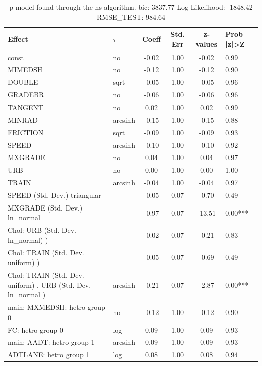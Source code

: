 \begin{table}
	\caption{p model found through the hs algorithm. bic: 3837.77 Log-Likelihood: -1848.42 RMSE_TEST: 984.64}
	\begin{center}
		\begin{tabular}{|l|l|c|c|c|l|}
			\hline
			Effect & $\tau$ & Coeff & Std. Err & z-values & Prob |z|>Z \\
			\hline
			const & no & -0.02 & 1.00 & -0.02 & 0.99 \\
			\hline
			MIMEDSH & no & -0.12 & 1.00 & -0.12 & 0.90 \\
			\hline
			DOUBLE & sqrt & -0.05 & 1.00 & -0.05 & 0.96 \\
			\hline
			GRADEBR & no & -0.06 & 1.00 & -0.06 & 0.96 \\
			\hline
			TANGENT & no & 0.02 & 1.00 & 0.02 & 0.99 \\
			\hline
			MINRAD & arcsinh & -0.15 & 1.00 & -0.15 & 0.88 \\
			\hline
			FRICTION & sqrt & -0.09 & 1.00 & -0.09 & 0.93 \\
			\hline
			SPEED & arcsinh & -0.10 & 1.00 & -0.10 & 0.92 \\
			\hline
			MXGRADE & no & 0.04 & 1.00 & 0.04 & 0.97 \\
			\hline
			URB & no & 0.00 & 1.00 & 0.00 & 1.00 \\
			\hline
			TRAIN & arcsinh & -0.04 & 1.00 & -0.04 & 0.97 \\
			\hline
			SPEED (Std. Dev.) triangular &  & -0.05 & 0.07 & -0.70 & 0.49 \\
			\hline
			MXGRADE (Std. Dev.) ln_normal &  & -0.97 & 0.07 & -13.51 & 0.00*** \\
			\hline
			 Chol: URB (Std. Dev. ln_normal) ) &  & -0.02 & 0.07 & -0.21 & 0.83 \\
			\hline
			 Chol: TRAIN (Std. Dev. uniform) ) &  & -0.05 & 0.07 & -0.69 & 0.49 \\
			\hline
			 Chol: TRAIN (Std. Dev. uniform) . URB (Std. Dev.   ln_normal ) & arcsinh & -0.21 & 0.07 & -2.87 & 0.00*** \\
			\hline
			main: MXMEDSH: hetro group 0 & no & -0.12 & 1.00 & -0.12 & 0.90 \\
			\hline
			FC: hetro group 0 & log & 0.09 & 1.00 & 0.09 & 0.93 \\
			\hline
			main: AADT: hetro group 1 & arcsinh & 0.09 & 1.00 & 0.09 & 0.93 \\
			\hline
			ADTLANE: hetro group 1 & log & 0.08 & 1.00 & 0.08 & 0.94 \\

\end{tabular}
\end{center}
\end{table}
